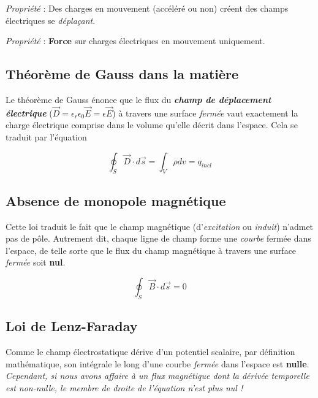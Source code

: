 \textit{Propriété} : Des charges en mouvement (accéléré ou non) créent des champs électriques se \textit{déplaçant}.

\textit{Propriété} : \textbf{Force} sur charges électriques en mouvement uniquement.


\subsection{Théorème de Gauss dans la matière}

Le théorème de Gauss énonce que le flux du \textit{\textbf{champ de déplacement électrique}} ($\vec{D} = \epsilon_{r}\epsilon_{0}\vec{E} = \epsilon \vec{E}$)
à travers une surface \textit{fermée} vaut exactement la charge électrique comprise dans le volume qu'elle décrit dans l'espace. Cela se traduit par l'équation 

\begin{equation}
 \oint_{S} \vec{D} \cdot d\vec{s} = \int_{V} \rho dv = q_{incl}
 \label{GaussIntegral}
\end{equation}

\subsection{Absence de monopole magnétique}

Cette loi traduit le fait que le champ magnétique (d'\textit{excitation} ou \textit{induit}) n'admet pas de pôle. 
Autrement dit, chaque ligne de champ forme une \textit{courbe} fermée dans l'espace, de telle sorte que le flux 
du champ magnétique à travers une surface \textit{fermée} soit \textbf{nul}.

\begin{equation}
 \oint_{S} \vec{B} \cdot d\vec{s} = 0
 \label{MonoPoleIntegral}
\end{equation}

\subsection{Loi de Lenz-Faraday}

Comme le champ électrostatique dérive d'un potentiel scalaire, par définition mathématique, son intégrale le long 
d'une courbe \textit{fermée} dans l'espace est \textbf{nulle}. %
\textit{Cependant, si nous avons affaire à un flux magnétique dont la dérivée temporelle est non-nulle, le membre de droite de l'équation n'est plus nul !}

